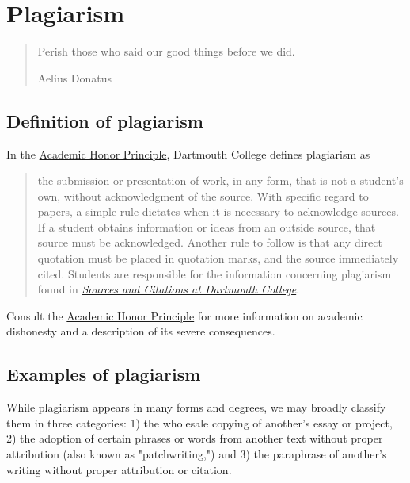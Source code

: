 


\chapter{Plagiarism}

\begin{quote} \small Perish those who said our good things before we did.

\textemdash Aelius Donatus \end{quote}


\hypertarget{plagiarism}{}
\section{Definition of plagiarism}

In the \href{http://www.dartmouth.edu/judicialaffairs/honor/index.html}{Academic Honor Principle}, Dartmouth College defines plagiarism as
\begin{quote}

the submission or presentation of work, in any form, that is not a student's own, without acknowledgment of the source. With specific regard to papers, a simple rule dictates when it is necessary to acknowledge sources. If a student obtains information or ideas from an outside source, that source must be acknowledged. Another rule to follow is that any direct quotation must be placed in quotation marks, and the source immediately cited. Students are responsible for the information concerning plagiarism found in \href{http://writing-speech.dartmouth.edu/learning/materials/sources-and-citations-dartmouth}{\emph{Sources and Citations at Dartmouth College}}.
\end{quote}

\noindent Consult the \href{http://www.dartmouth.edu/judicialaffairs/honor/index.html}{Academic Honor Principle} for more information on academic dishonesty and a description of its severe consequences.

\section{Examples of plagiarism}

While plagiarism appears in many forms and degrees, we may broadly classify them in three categories: 1) the wholesale copying of another's essay or project, 2) the adoption of certain phrases or words from another text without proper attribution (also known as "patchwriting,") and 3) the paraphrase of another's writing without proper attribution or citation. 

